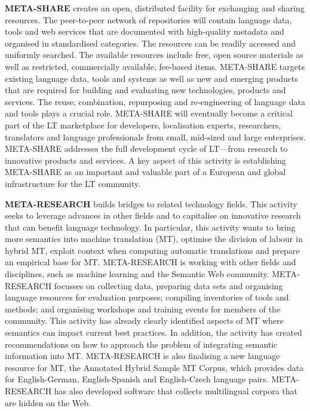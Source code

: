 \begin{multicols}{2}
\textbf{META-SHARE} creates an open, distributed facility for exchanging and sharing resources. The peer-to-peer network of repositories will contain language data, tools and web services that are documented with high-quality metadata and organised in standardised categories. The resources can be readily accessed and uniformly searched. The available resources include free, open source materials as well as restricted, commercially available, fee-based items. META-SHARE targets existing language data, tools and systems as well as new and emerging products that are required for building and evaluating new technologies, products and services. The reuse, combination, repurposing and re-engineering of language data and tools plays a crucial role. META-SHARE will eventually become a critical part of the LT marketplace for developers, localisation experts, researchers, translators and language professionals from small, mid-sized and large enterprises. META-SHARE addresses the full development cycle of LT—from research to innovative products and services. A key aspect of this activity is establishing META-SHARE as an important and valuable part of a European and global infrastructure for the LT community. 

\textbf{META-RESEARCH} builds bridges to related technology fields. This activity seeks to leverage advances in other fields and to capitalise on innovative research that can benefit language technology. In particular, this activity wants to bring more semantics into machine translation (MT), optimise the division of labour in hybrid MT, exploit context when computing automatic translations and prepare an empirical base for MT. META-RESEARCH is working with other fields and disciplines, such as machine learning and the Semantic Web community. META-RESEARCH focusses on collecting data, preparing data sets and organising language resources for evaluation purposes; compiling inventories of tools and methods; and organising workshops and training events for members of the community. This activity has already clearly identified aspects of MT where semantics can impact current best practices. In addition, the activity has created recommendations on how to approach the problem of integrating semantic information into MT. META-RESEARCH is also finalising a new language resource for MT, the Annotated Hybrid Sample MT Corpus, which provides data for English-German, English-Spanish and English-Czech language pairs. META-RESEARCH has also developed software that collects multilingual corpora that are hidden on the Web.
\end{multicols}

